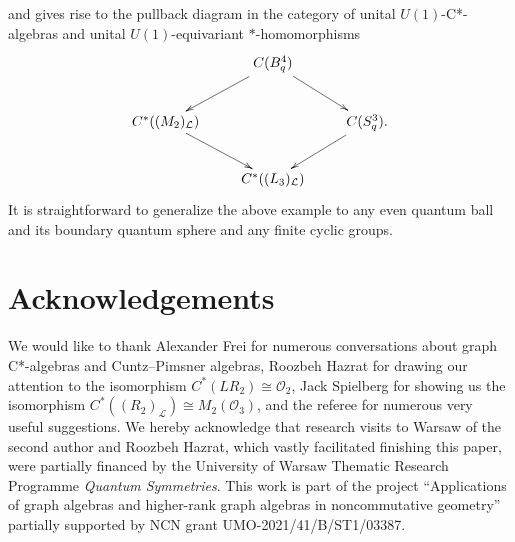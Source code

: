 \documentclass[12pt,times,a4paper]{amsart}
\numberwithin{equation}{section}
\numberwithin{equation}{section}
\begin{document}
and gives rise to the pullback diagram in the category of unital $U(1)$-C*-algebras and unital $U(1)$-equivariant $*$-homomorphisms
\begin{equation}
\xymatrix{
&
C(B^4_q)
\ar[dl] \ar[dr]&\\
C^*((M_2)_{\mathcal{L}})
\ar[dr] & & 
C(S^3_q).
\ar[dl]\\
& C^*((L_3)_{\mathcal{L}}) &
}
\end{equation}
It is straightforward to generalize the above example to any even quantum ball and its boundary quantum sphere and any finite cyclic groups.

\section*{Acknowledgements} 
\noindent
We would like to thank Alexander Frei for numerous conversations about graph C*-algebras and Cuntz--Pimsner algebras, 
Roozbeh Hazrat for drawing our attention to the isomorphism $C^*(LR_2)\cong\mathcal{O}_2$,  Jack Spielberg
for showing us the isomorphism $C^*((R_2)_\mathcal{L})\cong M_2(\mathcal{O}_3)$, 
and the referee for numerous very useful suggestions. We hereby acknowledge
that research visits to Warsaw of the second author and Roozbeh Hazrat, which vastly facilitated finishing this paper,
 were partially financed by the University of Warsaw Thematic Research Programme \emph{Quantum
Symmetries}.
This work is part of the project ``Applications of graph algebras and higher-rank graph algebras
in noncommutative geometry'' partially supported by NCN grant UMO-2021/41/B/ST1/03387.
\end{document}
